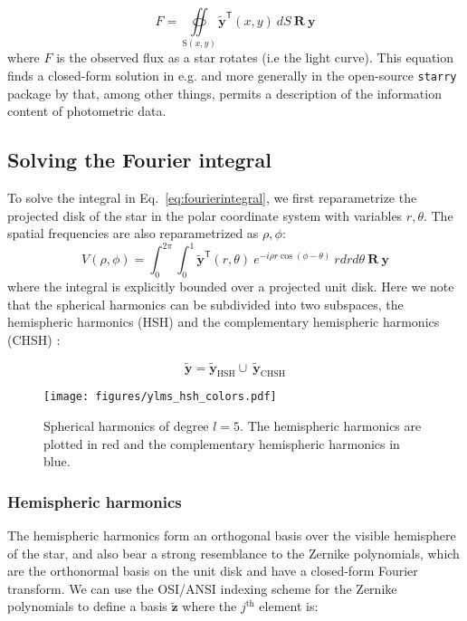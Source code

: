 \documentclass[modern]{aastex631}
\begin{document}
\begin{equation} \label{eq:fluxintegral}
   F = \oiint\limits_{\mathrm{S}(x,y)} \mathbf{\tilde{y}}^\mathsf{T}(x,y) \ dS \ \mathbf{R} \ \mathbf{y}
\end{equation}
where $F$ is the observed flux as a star rotates (i.e the light curve). This equation finds a closed-form solution in e.g. \citep{cowan2013} and more generally in the open-source \texttt{starry} package by \citep{starry2019} that, among other things, permits a description of the information content of photometric data.
\subsection{Solving the Fourier integral}

To solve the integral in Eq.~\ref{eq:fourierintegral}, we first reparametrize the projected disk of the star in the polar coordinate system with variables $r, \theta$. The spatial frequencies are also reparametrized as $\rho, \phi$:
\begin{equation} \label{eq:polarform}
   V(\rho,\phi) = \int_{0}^{2\pi}\int_{0}^{1} \mathbf{\tilde{y}}^\mathsf{T}(r, \theta) \ e^{-i\rho r\cos{(\phi-\theta)}} \ r dr d\theta \ \mathbf{R} \ \mathbf{y}
\end{equation} 
where the integral is explicitly bounded over a projected unit disk. Here we note that the spherical harmonics can be subdivided into two subspaces, the hemispheric harmonics (HSH) and the complementary hemispheric harmonics (CHSH) \citep{zheng2019}:

\begin{equation} \label{eq:hsh_chsh_union}
    \mathbf{\tilde{y}} = \mathbf{\tilde{y}}_{\mathrm{HSH}} \cup \ \mathbf{\tilde{y}}_{\mathrm{CHSH}}
\end{equation}

\begin{figure}[ht!]
    \begin{centering}
        \texttt{[image: figures/ylms\_hsh\_colors.pdf]}
        \caption{
        Spherical harmonics of degree $l=5$. The hemispheric harmonics are plotted in red and the complementary hemispheric harmonics in blue.
        }
        \label{fig:pyramid}
    \end{centering}
\end{figure}

\subsubsection{Hemispheric harmonics}
The hemispheric harmonics form an orthogonal basis over the visible hemisphere of the star, and also bear a strong resemblance to the Zernike polynomials, which are the orthonormal basis on the unit disk and have a closed-form Fourier transform. We can use the OSI/ANSI indexing scheme for the Zernike polynomials to define a basis $\mathbf{\tilde{z}}$ where the $j^\mathrm{th}$ element is:
\end{document}
